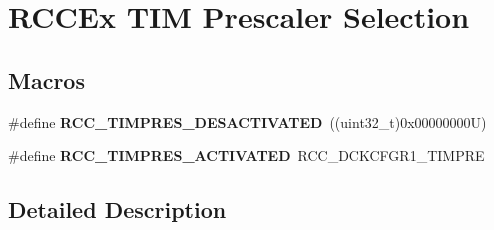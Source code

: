 \hypertarget{group___r_c_c_ex___t_i_m___prescaler___selection}{}\section{R\+C\+C\+Ex T\+IM Prescaler Selection}
\label{group___r_c_c_ex___t_i_m___prescaler___selection}
\subsection*{Macros}
\begin{DoxyCompactItemize}
\item 
\mbox{\label{group___r_c_c_ex___t_i_m___prescaler___selection_ga8151264a427f3eec6e6b641b8bbcbafa}} 
\#define {\bfseries R\+C\+C\+\_\+\+T\+I\+M\+P\+R\+E\+S\+\_\+\+D\+E\+S\+A\+C\+T\+I\+V\+A\+T\+ED}~((uint32\+\_\+t)0x00000000\+U)
\item 
\mbox{\label{group___r_c_c_ex___t_i_m___prescaler___selection_gae93dc9065111c8aa0e44c30dacc38536}} 
\#define {\bfseries R\+C\+C\+\_\+\+T\+I\+M\+P\+R\+E\+S\+\_\+\+A\+C\+T\+I\+V\+A\+T\+ED}~R\+C\+C\+\_\+\+D\+C\+K\+C\+F\+G\+R1\+\_\+\+T\+I\+M\+P\+RE
\end{DoxyCompactItemize}


\subsection{Detailed Description}
